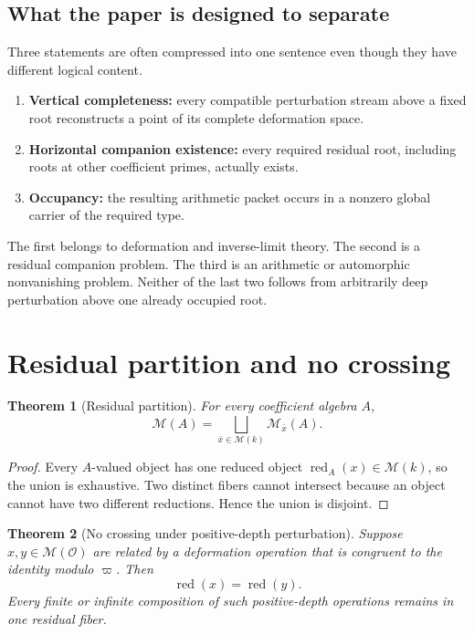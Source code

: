 \documentclass[11pt]{article}
\newtheorem{theorem}{Theorem}[section]
\theoremstyle{definition}
\theoremstyle{remark}
\newcommand{\Ocal}{\mathcal O}
\newcommand{\red}{\operatorname{red}}
\begin{document}
\subsection{What the paper is designed to separate}

Three statements are often compressed into one sentence even though they have different logical content.

\begin{enumerate}
\item \textbf{Vertical completeness:} every compatible perturbation stream above a fixed root reconstructs a point of its complete deformation space.
\item \textbf{Horizontal companion existence:} every required residual root, including roots at other coefficient primes, actually exists.
\item \textbf{Occupancy:} the resulting arithmetic packet occurs in a nonzero global carrier of the required type.
\end{enumerate}

The first belongs to deformation and inverse-limit theory.  The second is a residual companion problem.  The third is an arithmetic or automorphic nonvanishing problem.  Neither of the last two follows from arbitrarily deep perturbation above one already occupied root.

\section{Residual partition and no crossing}

\begin{theorem}[Residual partition]
For every coefficient algebra \(A\),
\[
\boxed{
\mathcal M(A)
=
\bigsqcup_{\bar x\in\mathcal M(k)}
\mathcal M_{\bar x}(A).
}
\]
\end{theorem}

\begin{proof}
Every \(A\)-valued object has one reduced object \(\red_A(x)\in\mathcal M(k)\), so the union is exhaustive.  Two distinct fibers cannot intersect because an object cannot have two different reductions.  Hence the union is disjoint.
\end{proof}

\begin{theorem}[No crossing under positive-depth perturbation]
Suppose \(x,y\in\mathcal M(\Ocal)\) are related by a deformation operation that is congruent to the identity modulo \(\varpi\).  Then
\[
\red(x)=\red(y).
\]
Every finite or infinite composition of such positive-depth operations remains in one residual fiber.
\end{theorem}
\end{document}
